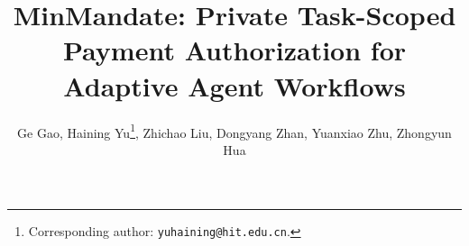 \documentclass[letterpaper]{article}
\begin{document}
\ifMMFinalEvidence
\renewcommand{\MMAOneAUC}{0.579}
\renewcommand{\MMATwoAUC}{0.476}
\renewcommand{\MMAZeroCandidateSet}{147.8}
\renewcommand{\MMApTwoExactJoinRecall}{1.000}
\renewcommand{\MMAtomicityTests}{4}
\renewcommand{\MMBenchmarkTasks}{96}
\renewcommand{\MMCanonicalEpisodes}{1,296}
\renewcommand{\MMCryptoDeltaCIHigh}{+0.9}
\renewcommand{\MMCryptoDeltaCILow}{-2.8}
\renewcommand{\MMCryptoDeltaPP}{-0.9}
\renewcommand{\MMLinkageTestPairs}{2,480}
\renewcommand{\MMLivePairs}{432}
\renewcommand{\MMMedianMiddlewareSharePct}{14.33}
\renewcommand{\MMMinMandateExactJoinRecall}{0.000}
\renewcommand{\MMMinMandateFalseJoinRate}{0.000}
\renewcommand{\MMModels}{3}
\renewcommand{\MMNativeTaskSuccessPct}{51.2}
\renewcommand{\MMNegativeCases}{21}
\renewcommand{\MMNegativeTrialsPerCase}{30}
\renewcommand{\MMNegativeTrialsTotal}{630}
\renewcommand{\MMPolicyDeltaCIHigh}{-1.2}
\renewcommand{\MMPolicyDeltaCILow}{-12.0}
\renewcommand{\MMPolicyDeltaPP}{-6.2}
\renewcommand{\MMPolicyOnlyTaskSuccessPct}{44.9}
\renewcommand{\MMRaceTrials}{400}
\renewcommand{\MMReferenceWireCalls}{780}
\renewcommand{\MMSeeds}{3}
\renewcommand{\MMTaskSuccessPct}{44.0}
\renewcommand{\MMTotalDeltaCIHigh}{-1.9}
\renewcommand{\MMTotalDeltaCILow}{-12.7}
\renewcommand{\MMTotalDeltaPP}{-7.2}
\renewcommand{\MMXFourZeroTwoExactJoinRecall}{1.000}

\fi

\title{MinMandate: Private Task-Scoped Payment Authorization for Adaptive Agent Workflows}

\author{Ge Gao, Haining Yu\thanks{\raggedright Corresponding author: \texttt{yuhaining@hit.edu.cn}.}, Zhichao Liu, Dongyang Zhan,
Yuanxiao Zhu, Zhongyun Hua}
\maketitle
\end{document}
